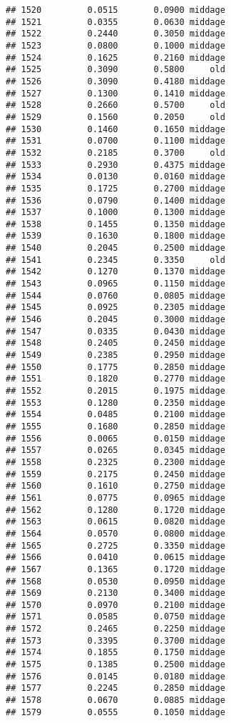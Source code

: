 \documentclass[
]{article}
\begin{document}
\begin{verbatim}
## 1520         0.0515       0.0900 middage
## 1521         0.0355       0.0630 middage
## 1522         0.2440       0.3050 middage
## 1523         0.0800       0.1000 middage
## 1524         0.1625       0.2160 middage
## 1525         0.3090       0.5800     old
## 1526         0.3090       0.4180 middage
## 1527         0.1300       0.1410 middage
## 1528         0.2660       0.5700     old
## 1529         0.1560       0.2050     old
## 1530         0.1460       0.1650 middage
## 1531         0.0700       0.1100 middage
## 1532         0.2185       0.3700     old
## 1533         0.2930       0.4375 middage
## 1534         0.0130       0.0160 middage
## 1535         0.1725       0.2700 middage
## 1536         0.0790       0.1400 middage
## 1537         0.1000       0.1300 middage
## 1538         0.1455       0.1350 middage
## 1539         0.1630       0.1800 middage
## 1540         0.2045       0.2500 middage
## 1541         0.2345       0.3350     old
## 1542         0.1270       0.1370 middage
## 1543         0.0965       0.1150 middage
## 1544         0.0760       0.0805 middage
## 1545         0.0925       0.2305 middage
## 1546         0.2045       0.3000 middage
## 1547         0.0335       0.0430 middage
## 1548         0.2405       0.2450 middage
## 1549         0.2385       0.2950 middage
## 1550         0.1775       0.2850 middage
## 1551         0.1820       0.2770 middage
## 1552         0.2015       0.1975 middage
## 1553         0.1280       0.2350 middage
## 1554         0.0485       0.2100 middage
## 1555         0.1680       0.2850 middage
## 1556         0.0065       0.0150 middage
## 1557         0.0265       0.0345 middage
## 1558         0.2325       0.2300 middage
## 1559         0.2175       0.2450 middage
## 1560         0.1610       0.2750 middage
## 1561         0.0775       0.0965 middage
## 1562         0.1280       0.1720 middage
## 1563         0.0615       0.0820 middage
## 1564         0.0570       0.0800 middage
## 1565         0.2725       0.3350 middage
## 1566         0.0410       0.0615 middage
## 1567         0.1365       0.1720 middage
## 1568         0.0530       0.0950 middage
## 1569         0.2130       0.3400 middage
## 1570         0.0970       0.2100 middage
## 1571         0.0585       0.0750 middage
## 1572         0.2465       0.2250 middage
## 1573         0.3395       0.3700 middage
## 1574         0.1855       0.1750 middage
## 1575         0.1385       0.2500 middage
## 1576         0.0145       0.0180 middage
## 1577         0.2245       0.2850 middage
## 1578         0.0670       0.0885 middage
## 1579         0.0555       0.1050 middage

\end{verbatim}
\end{document}
